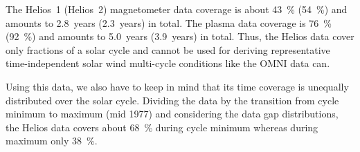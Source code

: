 The Helios~1 (Helios~2) magnetometer data coverage is about 43~\% (54~\%) and amounts to 2.8~years (2.3~years) in total. The plasma data coverage is 76~\% (92~\%) and amounts to 5.0~years (3.9~years) in total.
Thus, the Helios data cover only fractions of a solar cycle and cannot be used for deriving representative time-independent solar wind multi-cycle conditions like the OMNI data can.

Using this data, we also have to keep in mind that its time coverage is unequally distributed over the solar cycle. Dividing the data by the transition from cycle minimum to maximum (mid 1977) and considering the data gap distributions, the Helios data covers about \SI{68}{\percent} during cycle minimum whereas during maximum only \SI{38}{\percent}.\\

% 

